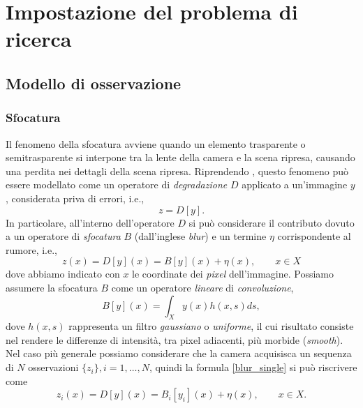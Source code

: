 \chapter{Impostazione del problema di ricerca}
\label{FormulazioneProblema}
\thispagestyle{empty}

\vspace{0.5cm}

\noindent 
\section{Modello di osservazione}
\subsection{Sfocatura}
Il fenomeno della sfocatura avviene quando un elemento trasparente o semitrasparente si interpone tra la lente della camera e la scena ripresa, causando una perdita nei dettagli della scena ripresa.
Riprendendo \cite{alippi2010detecting}, questo fenomeno pu\`o essere modellato come un operatore di \textit{degradazione} $D$ applicato a un'immagine $y$, considerata priva di errori, i.e.,
\begin{equation}
z=D[y].
\end{equation}
In particolare, all'interno dell'operatore $D$ si pu\`o considerare il contributo dovuto a un operatore di \textit{sfocatura} $B$ (dall'inglese \textit{blur}) e un termine $\eta$ corrispondente al rumore, i.e.,
\begin{equation}
\label{blur_single}
z(x)=D[y](x) = B[y](x) + \eta(x), \qquad x \in X
\end{equation}
dove abbiamo indicato con $x$ le coordinate dei \textit{pixel} dell'immagine. 
Possiamo assumere la sfocatura $B$ come un operatore \textit{lineare} di \textit{convoluzione},
\begin{equation}
B[y](x) = \int_{X}y(x)h(x,s)ds,
\end{equation}
dove $h(x,s)$ rappresenta un filtro \textit{gaussiano} o \textit{uniforme}, il cui risultato consiste nel rendere le differenze di intensit\`a, tra pixel adiacenti, pi\`u morbide (\textit{smooth}).\\
Nel caso pi\`u generale possiamo considerare che la camera acquisisca un sequenza di $N$ osservazioni $\{z_i\}, i = 1, \dots ,N$, quindi la formula \ref{blur_single} si pu\`o riscrivere come
\begin{equation}
\label{blur_multi}
z_i(x)=D[y](x) = B_i[y_i](x) + \eta(x), \qquad x \in X.
\end{equation}

